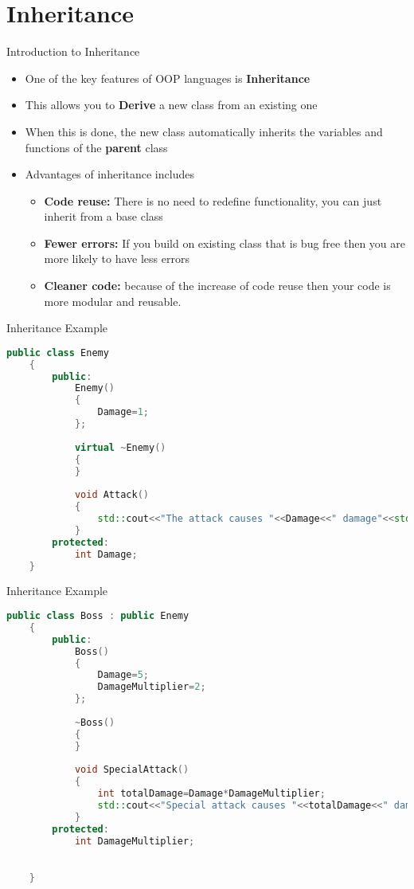 \part{Inheritance}
\frame{\partpage}

\begin{frame}{Introduction to Inheritance}
	\begin{itemize}
		\pause \item One of the key features of OOP languages is \textbf{Inheritance}
		\pause \item This allows you to \textbf{Derive} a new class from an existing one
		\pause \item When this is done, the new class automatically inherits the variables and functions of the \textbf{parent} class
		\pause \item Advantages of inheritance includes
		\begin{itemize}
			\pause \item \textbf{Code reuse:} There is no need to redefine functionality, you can just inherit from a base class
			\pause \item \textbf{Fewer errors:} If you build on existing class that is bug free then you are more likely to have less errors
			\pause \item \textbf{Cleaner code:} because of the increase of code reuse then your code is more modular and reusable. 
		\end{itemize}
	\end{itemize}
\end{frame}


\begin{frame}[fragile]{Inheritance Example}
	\begin{lstlisting}[language=C++,basicstyle=\tiny,]
	public class Enemy
	{
		public:
			Enemy()
			{
				Damage=1;
			};
			
			virtual ~Enemy()
			{
			}
			
			void Attack()
			{
				std::cout<<"The attack causes "<<Damage<<" damage"<<std::endl;
			}
		protected:
			int Damage;
	}
	\end{lstlisting}
\end{frame}

\begin{frame}[fragile]{Inheritance Example}
	\begin{lstlisting}[language=C++,basicstyle=\tiny,]
	public class Boss : public Enemy
	{
		public:
			Boss()
			{
				Damage=5;
				DamageMultiplier=2;
			};
			
			~Boss()
			{
			}
			
			void SpecialAttack()
			{
				int totalDamage=Damage*DamageMultiplier;
				std::cout<<"Special attack causes "<<totalDamage<<" damage"<<std::endl;
			}	
		protected:
			int DamageMultiplier;
		

	}
	\end{lstlisting}
\end{frame}

